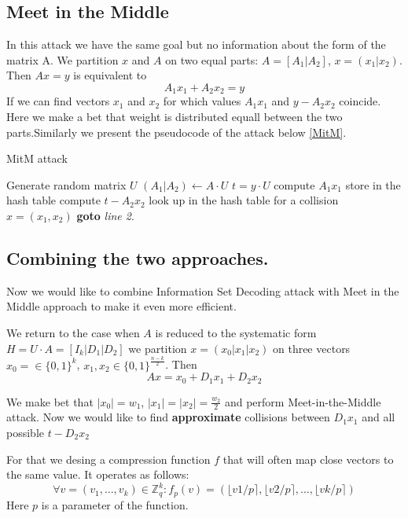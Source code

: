 \documentclass[12pt]{article}
\newcommand{\ZZ}{\mathbb{Z}}
\begin{document}
\subsection{Meet in the Middle}
In this attack we have the same goal but no information about the form of the matrix A.
We partition $x$ and $A$ on two equal parts: $A = [A_1 | A_2]$, $x = (x_1 | x_2)$.
Then $Ax = y$ is equivalent to
\[
    A_1x_1 + A_2x_2 = y
\]
If we can find vectors $x_1$ and $x_2$ for which values $A_1x_1$ and $y - A_2x_2$ coincide. Here we make a bet that weight is distributed equall between the two parts.Similarly we present the pseudocode of the attack below \ref{MitM}.


\begin{algorithm}
\caption{MitM attack}\label{MitM}
\begin{algorithmic}[1]
    \State Generate random matrix $U$
    \State $(A_1|A_2) \gets A \cdot U$
    \State $t = y \cdot U$
    \State compute $A_1x_1$
    \State store in the hash table
    \EndFor
    \State compute $t - A_2x_2$
    \State look up in the hash table for a collision
        \State \Return $x = (x_1, x_2)$
    \EndIf
    \EndFor
\State \textbf{goto} \emph{line 2}.
\EndProcedure
\end{algorithmic}
\end{algorithm}

\subsection{Combining the two approaches.}

Now we would like to combine Information Set Decoding attack with Meet in the Middle approach to make it even more efficient.

We return to the case when $A$ is reduced to the systematic form $H = U \cdot A = [I_{k}| D_1 | D_2]$ we partition $x = (x_0 |x_1 |x_2)$ on three vectors $x_0 = \in \{0,1\}^{k}$, $x_1,x_2 \in \{0,1\}^{\frac{n-k}{2}}$. Then
\[
  Ax = x_0 + D_1x_1 + D_2x_2
\]

We make bet that $|x_0| = w_1$, $|x_1| = |x_2| = \frac{w_2}{2}$ and perform Meet-in-the-Middle attack. Now we would like to find \textbf{approximate} collisions between $D_1x_1$ and all possible $t - D_2x_2$

For that we desing a compression function $f$ that will often map close vectors to the same value. It operates as follows:
\[
\forall v = (v_1, \dots , v_k)\in \ZZ_{q}^{k}: f_{p}(v) = (\lfloor v1/p \rceil, \lfloor v2/p \rceil, \dots, \lfloor vk/p \rceil)
\]
Here $p$ is a parameter of the function.
\end{document}
